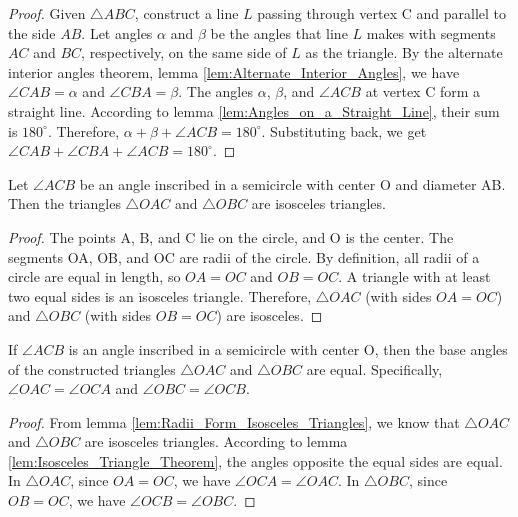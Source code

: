 \begin{proof}
    Given $\triangle ABC$, construct a line $L$ passing through vertex C and parallel to the side $AB$. Let angles $\alpha$ and $\beta$ be the angles that line $L$ makes with segments $AC$ and $BC$, respectively, on the same side of $L$ as the triangle. By the alternate interior angles theorem, lemma \ref{lem:Alternate_Interior_Angles}, we have $\angle CAB = \alpha$ and $\angle CBA = \beta$. The angles $\alpha$, $\beta$, and $\angle ACB$ at vertex C form a straight line. According to lemma \ref{lem:Angles_on_a_Straight_Line}, their sum is $180^\circ$. Therefore, $\alpha + \beta + \angle ACB = 180^\circ$. Substituting back, we get $\angle CAB + \angle CBA + \angle ACB = 180^\circ$.
\end{proof}

\begin{lemma}
    \label{lem:Radii_Form_Isosceles_Triangles}
    Let $\angle ACB$ be an angle inscribed in a semicircle with center O and diameter AB. Then the triangles $\triangle OAC$ and $\triangle OBC$ are isosceles triangles.
\end{lemma}

\begin{proof}
    The points A, B, and C lie on the circle, and O is the center. The segments OA, OB, and OC are radii of the circle. By definition, all radii of a circle are equal in length, so $OA = OC$ and $OB = OC$. A triangle with at least two equal sides is an isosceles triangle. Therefore, $\triangle OAC$ (with sides $OA=OC$) and $\triangle OBC$ (with sides $OB=OC$) are isosceles.
\end{proof}

\begin{lemma}
    \label{lem:Equality_of_Base_Angles}
    If $\angle ACB$ is an angle inscribed in a semicircle with center O, then the base angles of the constructed triangles $\triangle OAC$ and $\triangle OBC$ are equal. Specifically, $\angle OAC = \angle OCA$ and $\angle OBC = \angle OCB$.
\end{lemma}

\begin{proof}
    From lemma \ref{lem:Radii_Form_Isosceles_Triangles}, we know that $\triangle OAC$ and $\triangle OBC$ are isosceles triangles. According to lemma \ref{lem:Isosceles_Triangle_Theorem}, the angles opposite the equal sides are equal. In $\triangle OAC$, since $OA=OC$, we have $\angle OCA = \angle OAC$. In $\triangle OBC$, since $OB=OC$, we have $\angle OCB = \angle OBC$.
\end{proof}

